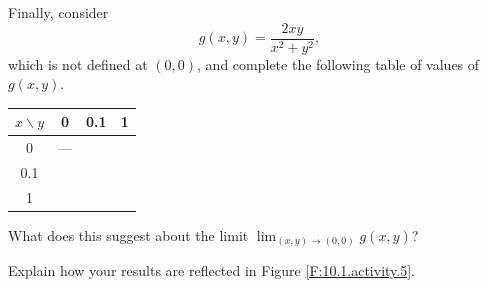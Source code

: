 \begin{pa}
\item Finally,
  consider
  $$
  g(x,y) = \frac{2xy}{x^2+y^2},
  $$
  which is not defined at $(0,0)$, and complete the following table of values of $g(x,y)$.

  \begin{center}
    \begin{tabular}{|c||c|c|c|}
      \hline
      $x\backslash y$ & 0 & 0.1 & 1 \\
      \hline
      \hline
      0 & --- & &  \\
      \hline
      0.1 & & & \\
      \hline
      1  & \hspace*{0.5in} & \hspace*{0.5in} & \hspace*{0.5in} \\
      \hline
    \end{tabular}
  \end{center}
  What does this suggest about the limit $\lim_{(x,y)\to(0,0)} g(x,y)$?

\item Explain how your results are reflected in Figure
  \ref{F:10.1.activity.5}. 


\end{pa}
